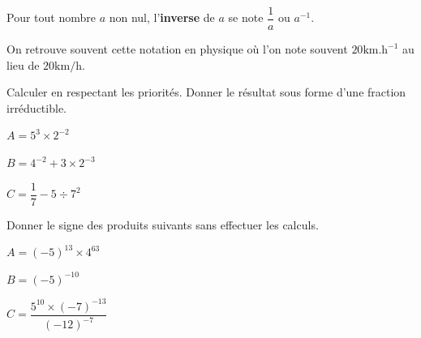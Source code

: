 \documentclass[a4paper]{book}
\begin{document}
    
    \begin{remarque}
        Pour tout nombre $a$ non nul, l'\textbf{inverse} de $a$ se note $\dfrac{1}{a}$ ou $a^{-1}$.

        \medskip

        On retrouve souvent cette notation en physique où l'on note souvent $20 \text{km.h}^{-1}$ au lieu de $20 \text{km}/\text{h}$.
    \end{remarque}


    \begin{exemple}
        Calculer en respectant les priorités. Donner le résultat sous forme d'une fraction irréductible.
        
        \begin{minipage}{0.30\linewidth}
            $A = 5^3\times2^{-2}$

            \vspace{3cm}
        \end{minipage}
        \hfill \vline \hfill
        \begin{minipage}{0.30\linewidth}
            $B = 4^{-2}+3\times2^{-3}$

            \vspace{3cm}
        \end{minipage}     
        \hfill \vline \hfill
        \begin{minipage}{0.30\linewidth}
             $C = \dfrac{1}{7}-5\div 7^2$ 

             \vspace{4cm}
        \end{minipage}     
    \end{exemple}


    \begin{exemple}
        Donner le signe des produits suivants sans effectuer les calculs.
        
        \begin{minipage}{0.30\linewidth}
            $A = (-5)^{13}\times4^{63}$

            \vspace{3cm}
        \end{minipage}
        \hfill \vline \hfill
        \begin{minipage}{0.30\linewidth}
            $B = (-5)^{-10}$

            \vspace{3cm}
        \end{minipage}     
        \hfill \vline \hfill
        \begin{minipage}{0.30\linewidth}
             $C = \dfrac{5^{10}\times (-7)^{-13}}{(-12)^{-7}}$ 

             \vspace{2.5cm}
        \end{minipage}     
    \end{exemple}
\end{document}
